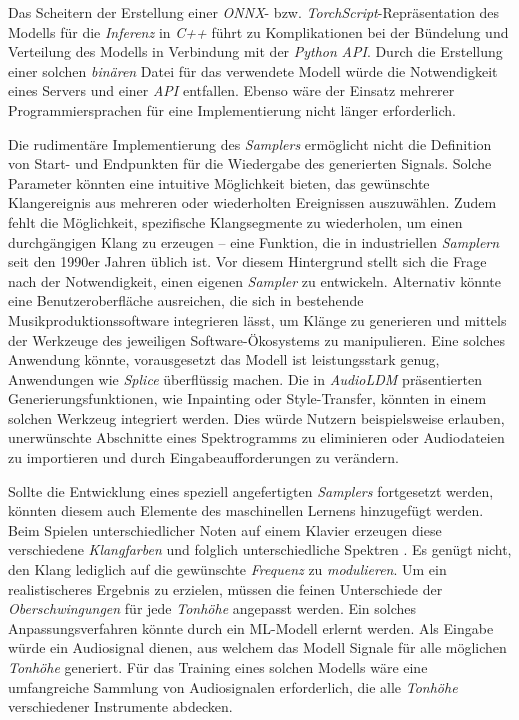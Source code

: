 \documentclass[
  a4paper,  %
  twoside,  %
  bibliography=totoc,
  headsepline,
  cleardoublepage=empty,
  parskip=half,
  draft=false
]{scrbook}
\begin{document}
Das Scheitern der Erstellung einer \emph{ONNX}- bzw. \emph{TorchScript}-Repräsentation des Modells für die \emph{Inferenz} in \emph{C++} führt zu Komplikationen bei der Bündelung und Verteilung des Modells in Verbindung mit der \emph{Python} \emph{API}. Durch die Erstellung einer solchen \emph{binären} Datei für das verwendete Modell würde die Notwendigkeit eines Servers und einer \emph{API} entfallen. Ebenso wäre der Einsatz mehrerer Programmiersprachen für eine Implementierung nicht länger erforderlich.

Die rudimentäre Implementierung des \emph{Samplers} ermöglicht nicht die Definition von Start- und Endpunkten für die Wiedergabe des generierten Signals. Solche Parameter könnten eine intuitive Möglichkeit bieten, das gewünschte Klangereignis aus mehreren oder wiederholten Ereignissen auszuwählen. Zudem fehlt die Möglichkeit, spezifische Klangsegmente zu wiederholen, um einen durchgängigen Klang zu erzeugen – eine Funktion, die in industriellen \emph{Samplern} seit den 1990er Jahren üblich ist. Vor diesem Hintergrund stellt sich die Frage nach der Notwendigkeit, einen eigenen \emph{Sampler} zu entwickeln. Alternativ könnte eine Benutzeroberfläche ausreichen, die sich in bestehende Musikproduktionssoftware integrieren lässt, um Klänge zu generieren und mittels der Werkzeuge des jeweiligen Software-Ökosystems zu manipulieren. Eine solches Anwendung könnte, vorausgesetzt das Modell ist leistungsstark genug, Anwendungen wie \emph{Splice} \cite{noauthor_royalty-free_nodate} überflüssig machen. Die in \emph{AudioLDM} \cite{liu_audioldm_2023} präsentierten Generierungsfunktionen, wie Inpainting oder Style-Transfer, könnten in einem solchen Werkzeug integriert werden. Dies würde Nutzern beispielsweise erlauben, unerwünschte Abschnitte eines Spektrogramms zu eliminieren oder Audiodateien zu importieren und durch Eingabeaufforderungen zu verändern.

Sollte die Entwicklung eines speziell angefertigten \emph{Samplers} fortgesetzt werden, könnten diesem auch Elemente des maschinellen Lernens hinzugefügt werden. Beim Spielen unterschiedlicher Noten auf einem Klavier erzeugen diese verschiedene \emph{Klangfarben} und folglich unterschiedliche Spektren \cite{parker_good_2009}. Es genügt nicht, den Klang lediglich auf die gewünschte \emph{Frequenz} zu \emph{modulieren}. Um ein realistischeres Ergebnis zu erzielen, müssen die feinen Unterschiede der \emph{Oberschwingungen} für jede \emph{Tonhöhe} angepasst werden. Ein solches Anpassungsverfahren könnte durch ein ML-Modell erlernt werden. Als Eingabe würde ein Audiosignal dienen, aus welchem das Modell Signale für alle möglichen \emph{Tonhöhe} generiert. Für das Training eines solchen Modells wäre eine umfangreiche Sammlung von Audiosignalen erforderlich, die alle \emph{Tonhöhe} verschiedener Instrumente abdecken.
\end{document}
